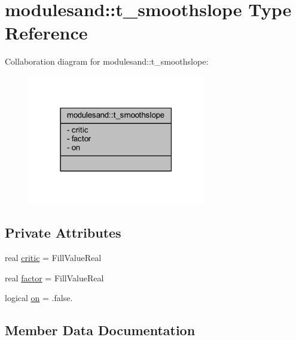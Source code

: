 \hypertarget{structmodulesand_1_1t__smoothslope}{}\section{modulesand\+:\+:t\+\_\+smoothslope Type Reference}
\label{structmodulesand_1_1t__smoothslope}


Collaboration diagram for modulesand\+:\+:t\+\_\+smoothslope\+:\nopagebreak
\begin{figure}[H]
\begin{center}
\leavevmode
\includegraphics[width=219pt]{structmodulesand_1_1t__smoothslope__coll__graph}
\end{center}
\end{figure}
\subsection*{Private Attributes}
\begin{DoxyCompactItemize}
\item 
real \mbox{\hyperlink{structmodulesand_1_1t__smoothslope_af8e3ebdd3e9e256a0032ec27c87b1650}{critic}} = Fill\+Value\+Real
\item 
real \mbox{\hyperlink{structmodulesand_1_1t__smoothslope_a32b46732076c630a118562465814a23f}{factor}} = Fill\+Value\+Real
\item 
logical \mbox{\hyperlink{structmodulesand_1_1t__smoothslope_a47e2c31da895ca2b39f01531a44e24f2}{on}} = .false.
\end{DoxyCompactItemize}


\subsection{Member Data Documentation}
\mbox{\label{structmodulesand_1_1t__smoothslope_af8e3ebdd3e9e256a0032ec27c87b1650}} 
